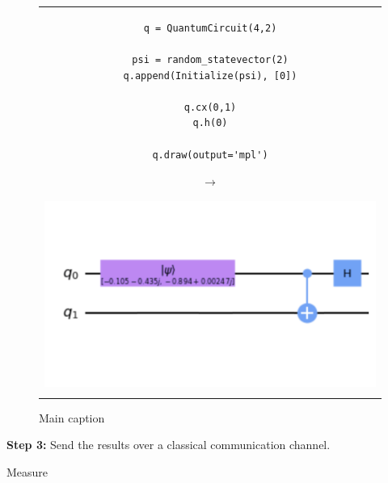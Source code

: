 \begin{figure}[h]
\centering
\begin{tabular}{c}
\begin{minipage}[c]{.45\linewidth}
\begin{verbatim}
q = QuantumCircuit(4,2)

psi = random_statevector(2)
q.append(Initialize(psi), [0])

q.cx(0,1)
q.h(0)

q.draw(output='mpl')
\end{verbatim}
\end{minipage}
\begin{minipage}[c]{.1\linewidth}
\centering
$\rightarrow$
\end{minipage}
\begin{minipage}[c]{.4\linewidth}
\centering
\includegraphics[width=\textwidth]{lab3/images/Step2.png}
\end{minipage}\\
\\ %
\end{tabular}
\caption{Main caption}
\label{step2}
\end{figure}


\textbf{Step 3:} Send the results over a classical communication channel.

Measure

